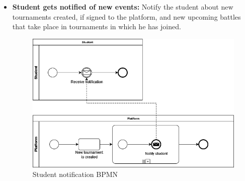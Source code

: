 \documentclass{article}
\begin{document}
{\begin{itemize}
          \newpage

    \item \textbf{Student gets notified of new events:} Notify the student about new tournaments created, if signed to the platform, and new upcoming battles that take place in tournaments in which he has joined.
          \begin{figure}[H]
              \centering
              \includegraphics[scale=0.4]{images/BPMN/BPMN5.png}
              \caption{Student notification BPMN}
              \label{fig:studNotificationBPMN}
          \end{figure}


\end{itemize}}
\end{document}

